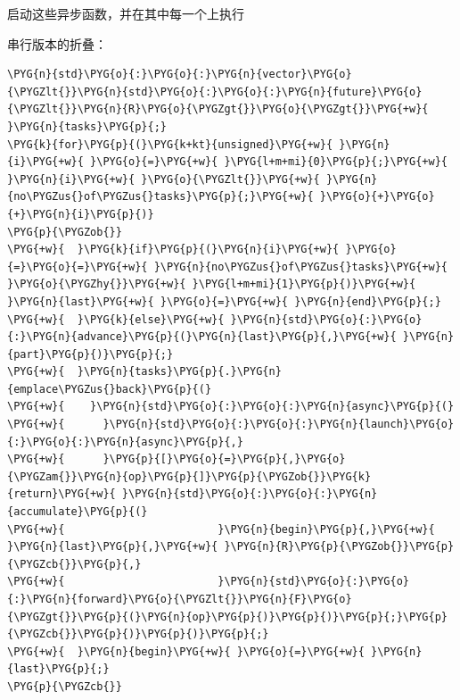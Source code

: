 
启动这些异步函数，并在其中每一个上执行



串行版本的折叠：



\begin{codeblockbg}
\begin{Verbatim}[commandchars=\\\{\},breaklines=true,breakanywhere=true,fontsize=\codefont,xleftmargin=17bp]
\PYG{n}{std}\PYG{o}{:}\PYG{o}{:}\PYG{n}{vector}\PYG{o}{\PYGZlt{}}\PYG{n}{std}\PYG{o}{:}\PYG{o}{:}\PYG{n}{future}\PYG{o}{\PYGZlt{}}\PYG{n}{R}\PYG{o}{\PYGZgt{}}\PYG{o}{\PYGZgt{}}\PYG{+w}{ }\PYG{n}{tasks}\PYG{p}{;}
\PYG{k}{for}\PYG{p}{(}\PYG{k+kt}{unsigned}\PYG{+w}{ }\PYG{n}{i}\PYG{+w}{ }\PYG{o}{=}\PYG{+w}{ }\PYG{l+m+mi}{0}\PYG{p}{;}\PYG{+w}{ }\PYG{n}{i}\PYG{+w}{ }\PYG{o}{\PYGZlt{}}\PYG{+w}{ }\PYG{n}{no\PYGZus{}of\PYGZus{}tasks}\PYG{p}{;}\PYG{+w}{ }\PYG{o}{+}\PYG{o}{+}\PYG{n}{i}\PYG{p}{)}
\PYG{p}{\PYGZob{}}
\PYG{+w}{  }\PYG{k}{if}\PYG{p}{(}\PYG{n}{i}\PYG{+w}{ }\PYG{o}{=}\PYG{o}{=}\PYG{+w}{ }\PYG{n}{no\PYGZus{}of\PYGZus{}tasks}\PYG{+w}{ }\PYG{o}{\PYGZhy{}}\PYG{+w}{ }\PYG{l+m+mi}{1}\PYG{p}{)}\PYG{+w}{ }\PYG{n}{last}\PYG{+w}{ }\PYG{o}{=}\PYG{+w}{ }\PYG{n}{end}\PYG{p}{;}
\PYG{+w}{  }\PYG{k}{else}\PYG{+w}{ }\PYG{n}{std}\PYG{o}{:}\PYG{o}{:}\PYG{n}{advance}\PYG{p}{(}\PYG{n}{last}\PYG{p}{,}\PYG{+w}{ }\PYG{n}{part}\PYG{p}{)}\PYG{p}{;}
\PYG{+w}{  }\PYG{n}{tasks}\PYG{p}{.}\PYG{n}{emplace\PYGZus{}back}\PYG{p}{(}
\PYG{+w}{    }\PYG{n}{std}\PYG{o}{:}\PYG{o}{:}\PYG{n}{async}\PYG{p}{(}
\PYG{+w}{      }\PYG{n}{std}\PYG{o}{:}\PYG{o}{:}\PYG{n}{launch}\PYG{o}{:}\PYG{o}{:}\PYG{n}{async}\PYG{p}{,}
\PYG{+w}{      }\PYG{p}{[}\PYG{o}{=}\PYG{p}{,}\PYG{o}{\PYGZam{}}\PYG{n}{op}\PYG{p}{]}\PYG{p}{\PYGZob{}}\PYG{k}{return}\PYG{+w}{ }\PYG{n}{std}\PYG{o}{:}\PYG{o}{:}\PYG{n}{accumulate}\PYG{p}{(}
\PYG{+w}{                        }\PYG{n}{begin}\PYG{p}{,}\PYG{+w}{ }\PYG{n}{last}\PYG{p}{,}\PYG{+w}{ }\PYG{n}{R}\PYG{p}{\PYGZob{}}\PYG{p}{\PYGZcb{}}\PYG{p}{,}
\PYG{+w}{                        }\PYG{n}{std}\PYG{o}{:}\PYG{o}{:}\PYG{n}{forward}\PYG{o}{\PYGZlt{}}\PYG{n}{F}\PYG{o}{\PYGZgt{}}\PYG{p}{(}\PYG{n}{op}\PYG{p}{)}\PYG{p}{)}\PYG{p}{;}\PYG{p}{\PYGZcb{}}\PYG{p}{)}\PYG{p}{)}\PYG{p}{;}
\PYG{+w}{  }\PYG{n}{begin}\PYG{+w}{ }\PYG{o}{=}\PYG{+w}{ }\PYG{n}{last}\PYG{p}{;}
\PYG{p}{\PYGZcb{}}
\end{Verbatim}
\end{codeblockbg}



